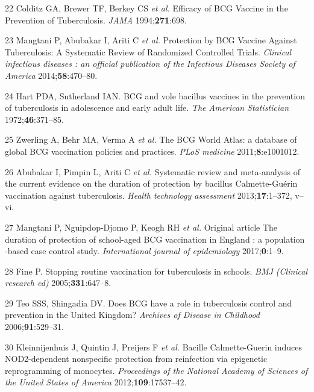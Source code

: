 \documentclass[11pt,twoside]{bristolthesis}
\begin{document}
  \leavevmode\hypertarget{ref-Colditz1994}{}%
  22 Colditz GA, Brewer TF, Berkey CS \emph{et al.} Efficacy of BCG Vaccine in the Prevention of Tuberculosis. \emph{JAMA} 1994;\textbf{271}:698.
  
  \leavevmode\hypertarget{ref-Mangtani2014a}{}%
  23 Mangtani P, Abubakar I, Ariti C \emph{et al.} Protection by BCG Vaccine Against Tuberculosis: A Systematic Review of Randomized Controlled Trials. \emph{Clinical infectious diseases : an official publication of the Infectious Diseases Society of America} 2014;\textbf{58}:470--80.
  
  \leavevmode\hypertarget{ref-Hart1972}{}%
  24 Hart PDA, Sutherland IAN. BCG and vole bacillus vaccines in the prevention of tuberculosis in adolescence and early adult life. \emph{The American Statistician} 1972;\textbf{46}:371--85.
  
  \leavevmode\hypertarget{ref-Zwerling2011}{}%
  25 Zwerling A, Behr MA, Verma A \emph{et al.} The BCG World Atlas: a database of global BCG vaccination policies and practices. \emph{PLoS medicine} 2011;\textbf{8}:e1001012.
  
  \leavevmode\hypertarget{ref-Abubakar2013}{}%
  26 Abubakar I, Pimpin L, Ariti C \emph{et al.} Systematic review and meta-analysis of the current evidence on the duration of protection by bacillus Calmette-Guérin vaccination against tuberculosis. \emph{Health technology assessment} 2013;\textbf{17}:1--372, v--vi.
  
  \leavevmode\hypertarget{ref-Mangtani2017}{}%
  27 Mangtani P, Nguipdop-Djomo P, Keogh RH \emph{et al.} Original article The duration of protection of school-aged BCG vaccination in England : a population -based case control study. \emph{International journal of epidemiology} 2017;\textbf{0}:1--9.
  
  \leavevmode\hypertarget{ref-Fine2005a}{}%
  28 Fine P. Stopping routine vaccination for tuberculosis in schools. \emph{BMJ (Clinical research ed)} 2005;\textbf{331}:647--8.
  
  \leavevmode\hypertarget{ref-Teo2006}{}%
  29 Teo SSS, Shingadia DV. Does BCG have a role in tuberculosis control and prevention in the United Kingdom? \emph{Archives of Disease in Childhood} 2006;\textbf{91}:529--31.
  
  \leavevmode\hypertarget{ref-Kleinnijenhuis2012}{}%
  30 Kleinnijenhuis J, Quintin J, Preijers F \emph{et al.} Bacille Calmette-Guerin induces NOD2-dependent nonspecific protection from reinfection via epigenetic reprogramming of monocytes. \emph{Proceedings of the National Academy of Sciences of the United States of America} 2012;\textbf{109}:17537--42.
  
\end{document}

